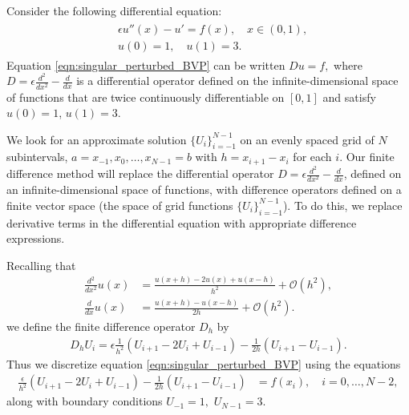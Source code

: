 Consider the following differential equation: 
\begin{align}
	\begin{split}
	&{ } \epsilon u''(x)-u'= f(x), \quad x \in (0,1), \\
	&{ } u(0) = 1, \quad u(1) = 3.
	\end{split} \label{eqn:singular_perturbed_BVP}
\end{align}
Equation \eqref{eqn:singular_perturbed_BVP} can be written $D u = f,$ where $D = \epsilon \frac{d^2}{dx^2} - \frac{d}{dx}$ is a differential operator defined on the infinite-dimensional space of functions that are twice continuously differentiable on $[0,1]$ and satisfy $u(0) = 1$, $u(1) = 3$.

We look for an approximate solution $\{U_i\}_{i=-1}^{N-1}$ on an evenly spaced grid of $N$ subintervals, $a = x_{-1}, x_0, \ldots, x_{N-1} = b$ with $h = x_{i+1}-x_i$ for each $i$.
Our finite difference method will replace the differential operator $D = \epsilon \frac{d^2}{dx^2} - \frac{d}{dx}$, defined on an infinite-dimensional space of functions, with difference operators defined on a finite vector space (the space of grid functions $\{U_i\}_{i=-1}^{N-1}$).
To do this, we replace derivative terms in the differential equation with appropriate difference expressions.

Recalling that
\begin{align*}
	\frac{d^2}{dx^2} u(x) &= \frac{u(x+h)- 2u(x) + u(x-h)}{h^2} + \mathcal{O}(h^2),\\
\frac{d}{dx} u(x) &= \frac{u(x+h)-u(x-h)}{2h} + \mathcal{O}(h^2).
\end{align*}
we define the finite difference operator $D_h$ by  
\begin{align}
D_h U_i = \epsilon \frac{1}{h^2}\left(U_{i+1} -2U_i + U_{i-1}\right) - \frac{1}{2h} \left(U_{i+1}-U_{i-1} \right). \label{fd_operator}
\end{align}
Thus we discretize equation \eqref{eqn:singular_perturbed_BVP} using the equations 
\begin{align*}
	\frac{\epsilon}{h^2} (U_{i+1}- 2U_i + U_{i-1}) - \frac{1}{2h} \left(U_{i+1}-U_{i-1} \right)  &= f(x_i), \quad i = 0, \ldots, N-2,
\end{align*}
along with boundary conditions $U_{-1} = 1,$ $U_{N-1} = 3$.

